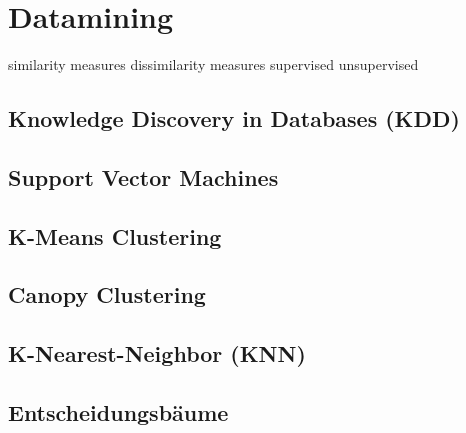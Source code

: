 \section{Datamining}

similarity measures
dissimilarity measures
supervised
unsupervised


\subsection{Knowledge Discovery in Databases (KDD)}

\subsection{Support Vector Machines}

\subsection{K-Means Clustering}

\subsection{Canopy Clustering}

\subsection{K-Nearest-Neighbor (KNN)}

\subsection{Entscheidungsbäume}
